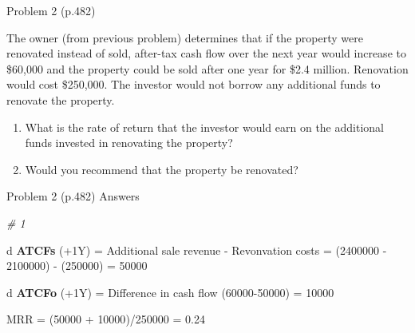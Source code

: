 \documentclass[ignorenonframetext,]{beamer}
\newenvironment{Shaded}{\begin{snugshade}}{\end{snugshade}}
\newcommand{\KeywordTok}[1]{\textcolor[rgb]{0.13,0.29,0.53}{\textbf{{#1}}}}
\newcommand{\DecValTok}[1]{\textcolor[rgb]{0.00,0.00,0.81}{{#1}}}
\newcommand{\FloatTok}[1]{\textcolor[rgb]{0.00,0.00,0.81}{{#1}}}
\newcommand{\StringTok}[1]{\textcolor[rgb]{0.31,0.60,0.02}{{#1}}}
\newcommand{\CommentTok}[1]{\textcolor[rgb]{0.56,0.35,0.01}{\textit{{#1}}}}
\newcommand{\NormalTok}[1]{{#1}}
\providecommand{\tightlist}{%
\setlength{\itemsep}{0pt}\setlength{\parskip}{0pt}}
\begin{document}
\begin{frame}{Problem 2 (p.482)}

\small

The owner (from previous problem) determines that if the property were
renovated instead of sold, after-tax cash flow over the next year would
increase to \$60,000 and the property could be sold after one year for
\$2.4 million. Renovation would cost \$250,000. The investor would not
borrow any additional funds to renovate the property.

\begin{enumerate}
\def\labelenumi{\arabic{enumi}.}
\tightlist
\item
  What is the rate of return that the investor would earn on the
  additional funds invested in renovating the property?
\item
  Would you recommend that the property be renovated?
\end{enumerate}

\end{frame}

\begin{frame}[fragile]{Problem 2 (p.482) Answers}

\footnotesize

\begin{Shaded}
\begin{Highlighting}[]
\CommentTok{# 1 }

\NormalTok{d }\KeywordTok{ATCFs} \NormalTok{(+1Y) =}\StringTok{ }\NormalTok{Additional sale revenue -}\StringTok{ }\NormalTok{Revonvation costs}
  \NormalTok{=}\StringTok{ }\NormalTok{(}\DecValTok{2400000} \NormalTok{-}\StringTok{ }\DecValTok{2100000}\NormalTok{) -}\StringTok{ }\NormalTok{(}\DecValTok{250000}\NormalTok{) =}\StringTok{ }\DecValTok{50000}
  
\NormalTok{d }\KeywordTok{ATCFo} \NormalTok{(+1Y) =}\StringTok{ }\NormalTok{Difference in cash flow }
  \NormalTok{(}\DecValTok{60000-50000}\NormalTok{) =}\StringTok{ }\DecValTok{10000}

\NormalTok{MRR =}\StringTok{ }
\NormalTok{(}\DecValTok{50000} \NormalTok{+}\StringTok{ }\DecValTok{10000}\NormalTok{)/}\DecValTok{250000} \NormalTok{=}\StringTok{ }\FloatTok{0.24}
\end{Highlighting}
\end{Shaded}

\normalsize

\end{frame}
\end{document}

